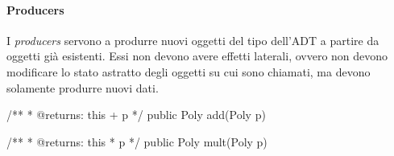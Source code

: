 \paragraph{Producers}
I \emph{producers} servono a produrre nuovi oggetti del tipo dell'ADT a partire da oggetti già esistenti. Essi non devono avere effetti laterali, ovvero non devono modificare lo stato astratto degli oggetti su cui sono chiamati, ma devono solamente produrre nuovi dati.
\begin{Java}
    /**
     * @returns: this + p
     */
    public Poly add(Poly p) { }

    /**
     * @returns: this * p
     */
    public Poly mult(Poly p) { }
\end{Java}